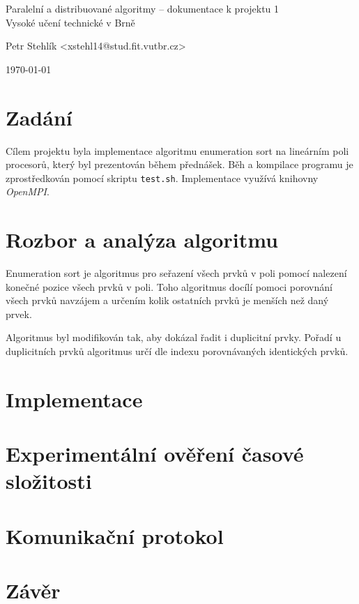\documentclass[11pt,a4paper]{article}
\begin{document}
\begin{center}
	\LARGE{Paralelní a distribuované algoritmy -- dokumentace k projektu 1}\\
	\large{Vysoké učení technické v Brně}
	\vspace{0.5cm}

	Petr Stehlík <xstehl14@stud.fit.vutbr.cz>

	\vspace{0.2cm}

	\today

\end{center}

\section{Zadání}

Cílem projektu byla implementace algoritmu enumeration sort na lineárním poli procesorů, který byl prezentován během přednášek. Běh a kompilace programu je zprostředkován pomocí skriptu \texttt{test.sh}. Implementace využívá knihovny \textit{OpenMPI}.


\section{Rozbor a analýza algoritmu}

Enumeration sort je algoritmus pro seřazení všech prvků v poli pomocí nalezení konečné pozice všech prvků v poli. Toho algoritmus docílí pomoci porovnání všech prvků navzájem a určením kolik ostatních prvků je menších než daný prvek.

Algoritmus byl modifikován tak, aby dokázal řadit i duplicitní prvky. Pořadí u duplicitních prvků algoritmus určí dle indexu porovnávaných identických prvků.


\section{Implementace}

\section{Experimentální ověření časové složitosti}

\section{Komunikační protokol}


\section{Závěr}
\end{document}
